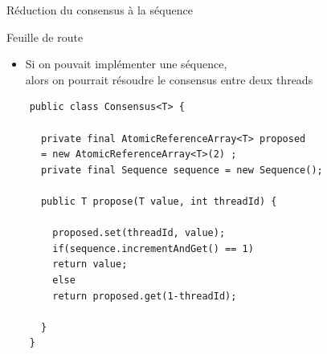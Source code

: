 
\begingroup

\begin{frame}[fragile]{Réduction du consensus à la séquence}

  \begin{exampleblock}{Feuille de route}
    \begin{itemize}
    \item[Thm1 :] Si on pouvait implémenter une séquence, \\ \hspace{5mm} alors on pourrait résoudre le consensus {\color{exampleColor}entre deux threads}
    \end{itemize}
  \end{exampleblock}

  \begin{lstlisting}
    public class Consensus<T> {
      
      private final AtomicReferenceArray<T> proposed
      = new AtomicReferenceArray<T>(2) ;
      private final Sequence sequence = new Sequence();
      
      public T propose(T value, int threadId) {
        
        proposed.set(threadId, value);
        if(sequence.incrementAndGet() == 1)
        return value;
        else
        return proposed.get(1-threadId);

      }
    }
  \end{lstlisting}

  
\end{frame}

\endgroup
\endinput
